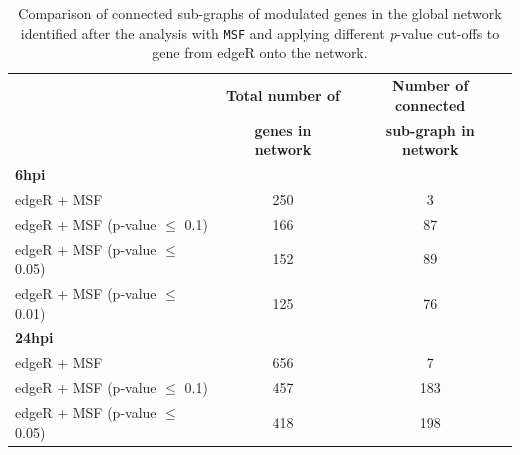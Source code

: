 \documentclass[10pt,a4paper,twocolumn]{article}
\begin{document}
\begin{table}[]
	\centering
	\caption{Comparison of connected sub-graphs of modulated genes
          in the global network identified after the analysis with
          \texttt{MSF} and applying different \textit{p}-value cut-offs to gene from edgeR onto the network. }
	\label{tab:rawVsHartung}
	\begin{tabular}{lll}
		\hline
		\multicolumn{1}{|l|}{}                            & \multicolumn{1}{c|}{\textbf{Total number of}}       & \multicolumn{1}{c|}{\textbf{Number of connected}}      \\
                \multicolumn{1}{|l|}{}                            & \multicolumn{1}{c|}{\textbf{genes in network}}      & \multicolumn{1}{c|}{\textbf{sub-graph in network}}     \\ \hline
		\multicolumn{1}{|l|}{\textbf{6hpi}}               & \multicolumn{1}{l|}{}                                                & \multicolumn{1}{c|}{}                 \\ \hline
		\multicolumn{1}{|l|}{edgeR + MSF}                 & \multicolumn{1}{c|}{250}                                             & \multicolumn{1}{c|}{3}                \\ \hline
		\multicolumn{1}{|l|}{edgeR + MSF (p-value $\leq$ 0.1)}  & \multicolumn{1}{c|}{166}                                             & \multicolumn{1}{c|}{87}               \\ \hline
		\multicolumn{1}{|l|}{edgeR + MSF (p-value $\leq$ 0.05)} & \multicolumn{1}{c|}{152}                                             & \multicolumn{1}{c|}{89}               \\ \hline
		\multicolumn{1}{|l|}{edgeR + MSF (p-value $\leq$ 0.01)} & \multicolumn{1}{c|}{125}                                             & \multicolumn{1}{c|}{76}               \\ \hline
		\multicolumn{1}{|l|}{\textbf{24hpi}}              & \multicolumn{1}{c|}{}                                                & \multicolumn{1}{c|}{}                 \\ \hline
		\multicolumn{1}{|l|}{edgeR + MSF}                 & \multicolumn{1}{c|}{656}                                             & \multicolumn{1}{c|}{7}                \\ \hline
		\multicolumn{1}{|l|}{edgeR + MSF (p-value $\leq$ 0.1)}  & \multicolumn{1}{c|}{457}                                             & \multicolumn{1}{c|}{183}               \\ \hline
		\multicolumn{1}{|l|}{edgeR + MSF (p-value $\leq$ 0.05)} & \multicolumn{1}{c|}{418}                                             & \multicolumn{1}{c|}{198}              \\ \hline

\end{tabular}
\end{table}
\end{document}

